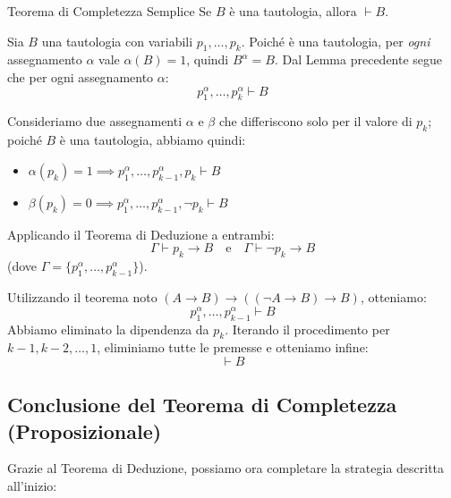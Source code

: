 \documentclass[a4paper,11pt]{report}
\begin{document}
\begin{thmframe}{Teorema di Completezza Semplice}{}
    Se \( B \) è una tautologia, allora \( \vdash B \).

\end{thmframe}
\begin{pframe}
    Sia \( B \) una tautologia con variabili \( p_1, \dots, p_k \).
    Poiché è una tautologia, per \textit{ogni} assegnamento \( \alpha \) vale \( \alpha(B)=1 \), quindi \( B^\alpha = B \).
    Dal Lemma precedente segue che per ogni assegnamento \( \alpha \):
    \[ p_1^\alpha, \dots, p_k^\alpha \vdash B \]

    Consideriamo due assegnamenti \( \alpha \) e \( \beta \) che differiscono solo per il valore di \( p_k \); poiché \( B \) è una tautologia, abbiamo quindi:
    \begin{itemize}
        \item \( \alpha(p_k)=1 \implies p_1^\alpha, \dots, p_{k-1}^\alpha, p_k \vdash B \)
        \item \( \beta(p_k)=0 \implies p_1^\alpha, \dots, p_{k-1}^\alpha, \neg p_k \vdash B \)
    \end{itemize}
    Applicando il Teorema di Deduzione a entrambi:
    \[ \Gamma \vdash p_k \to B \quad \text{e} \quad \Gamma \vdash \neg p_k \to B \]
    (dove \( \Gamma = \{p_1^\alpha, \dots, p_{k-1}^\alpha\} \)).

    Utilizzando il teorema noto \( (A \to B) \to ((\neg A \to B) \to B) \), otteniamo:
    \[ p_1^\alpha, \dots, p_{k-1}^\alpha \vdash B \]
    Abbiamo eliminato la dipendenza da \( p_k \). Iterando il procedimento per \( k-1, k-2, \dots, 1 \), eliminiamo tutte le premesse e otteniamo infine:
    \[ \vdash B \]
\end{pframe}

\subsection{Conclusione del Teorema di Completezza (Proposizionale)}

Grazie al Teorema di Deduzione, possiamo ora completare la strategia descritta all'inizio:
\end{document}
